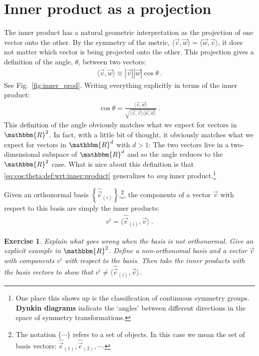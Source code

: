 \documentclass[
  11pt,
	colorful,
	raggedright,
]{tufte-style-thesis-flip}
\newtheorem{exercise}{Exercise}[section]
\begin{document}
\section{Inner product as a projection}


The inner product has a natural geometric interpretation as the projection of one vector onto the other. By the symmetry of the metric, $\langle \vec v, \vec w \rangle = \langle \vec w, \vec v \rangle$, it does not matter which vector is being projected onto the other. This projection gives a definition of the angle, $\theta$, between two vectors:
\begin{align}
  \langle \vec v , \vec w \rangle \equiv |\vec v| |\vec w| \cos \theta \ .
\end{align}
See Fig.~\ref{fig:inner_prod}.
Writing everything explicitly in terms of the inner product:
\begin{align}
  \cos \theta = \frac{\langle \vec v , \vec w \rangle}{\sqrt{\langle \vec v , \vec v \rangle\langle \vec w , \vec w \rangle}} \ .
  \label{eq:cos:theta:def:wrt:inner:product}
\end{align}
This definition of the angle obviously matches what we expect for vectors in $\mathbbm{R}^2$. In fact, with a little bit of thought, it obviously matches what we expect for vectors in $\mathbbm{R}^d$ with $d>1$: The two vectors live in a two-dimensional subspace of $\mathbbm{R}^d$ and so the angle reduces to the $\mathbbm{R}^2$ case. What is nice about this definition is that \eqref{eq:cos:theta:def:wrt:inner:product} generalizes to \emph{any} inner product.\footnote{One place this shows up is the classification of continuous symmetry groups. \textbf{Dynkin diagrams} indicate the `angles' between different directions in the space of symmetry transformations.} 

Given an orthonormal basis $\left\{\hat{\vec{e}}_{(i)}\right\}$,\footnote{The notation $\{\cdots\}$ refers to a set of objects. In this case we mean the set of basis vectors: $\hat{\vec{e}}_{(1)}, \hat{\vec{e}}_{(2)}, \cdots$. }, the components of a vector $\vec v$ with respect to this basis are simply the inner products:
\begin{align}
  v^i = \langle \hat{\vec{e}}_{(i)}, \vec v \rangle \ .
\end{align}
\begin{exercise}
Explain what goes wrong when the basis is not orthonormal. Give an explicit example in $\mathbbm{R}^2$. Define a non-orthonomal basis and a vector $\vec v$ with components $v^i$ with respect to the basis. Then take the inner products with the basis vectors to show that $v^i \neq \langle \hat{\vec{e}}_{(i)}, \vec v \rangle$.
\end{exercise}
\end{document}
